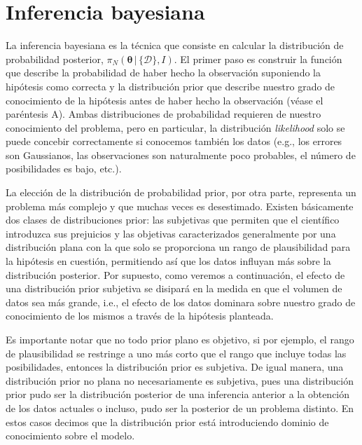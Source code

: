 \documentclass[a4paper,twoside]{article}
\newcommand{\br}{\ensuremath{\,|\,}\xspace}
\newcommand{\hip}{\ensuremath{\mathbold{\theta}}\xspace}
\newcommand{\dat}{\ensuremath{\{\mathcal{D}\}}\xspace}
\newcommand{\pos}[2]{\ensuremath{\pi_N\left(#1\br #2\right)}\xspace}
\begin{document}

\section{Inferencia bayesiana}
%
La inferencia bayesiana es la técnica que consiste en calcular la distribución de probabilidad
posterior, \(\pos{\hip}{\dat,I}\). El primer paso es construir la función que describe la
probabilidad de haber hecho la observación suponiendo la hipótesis como correcta y la distribución
prior que describe nuestro grado de conocimiento de la hipótesis antes de haber hecho la observación
(véase el paréntesis A). Ambas distribuciones de probabilidad requieren de nuestro conocimiento del
problema, pero en particular, la distribución \emph{likelihood} solo se puede concebir correctamente
si conocemos también los datos (e.g., los errores son Gaussianos, las observaciones son naturalmente
poco probables, el número de posibilidades es bajo, etc.).

La elección de la distribución de probabilidad prior, por otra parte, representa un problema más
complejo y que muchas veces es desestimado. Existen básicamente dos clases de distribuciones prior:
las subjetivas que permiten que el científico introduzca sus prejuicios y las objetivas
caracterizados generalmente por una distribución plana con la que solo se proporciona un rango de
plausibilidad para la hipótesis en cuestión, permitiendo así que los datos influyan más sobre la
distribución posterior. Por supuesto, como veremos a continuación, el efecto de una distribución
prior subjetiva se disipará en la medida en que el volumen de datos sea más grande, i.e., el efecto
de los datos dominara sobre nuestro grado de conocimiento de los mismos a través de la hipótesis
planteada.

Es importante notar que no todo prior plano es objetivo, si por ejemplo, el rango de plausibilidad
se restringe a uno más corto que el rango que incluye todas las posibilidades, entonces la
distribución prior es subjetiva. De igual manera, una distribución prior no plana no necesariamente
es subjetiva, pues una distribución prior pudo ser la distribución posterior de una inferencia
anterior a la obtención de los datos actuales o incluso, pudo ser la posterior de un problema
distinto. En estos casos decimos que la distribución prior está introduciendo dominio de
conocimiento sobre el modelo.

\end{document}
